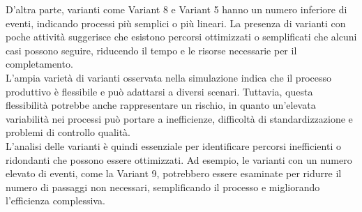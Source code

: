 \documentclass{article}
\begin{document}
D'altra parte, varianti come Variant 8 e Variant 5 hanno un numero inferiore di eventi, indicando processi più semplici o più lineari. La presenza di varianti con poche attività suggerisce che esistono percorsi ottimizzati o semplificati che alcuni casi possono seguire, riducendo il tempo e le risorse necessarie per il completamento.\\
L'ampia varietà di varianti osservata nella simulazione indica che il processo produttivo è flessibile e può adattarsi a diversi scenari. Tuttavia, questa flessibilità potrebbe anche rappresentare un rischio, in quanto un'elevata variabilità nei processi può portare a inefficienze, difficoltà di standardizzazione e problemi di controllo qualità.\\
L'analisi delle varianti è quindi essenziale per identificare percorsi inefficienti o ridondanti che possono essere ottimizzati. Ad esempio, le varianti con un numero elevato di eventi, come la Variant 9, potrebbero essere esaminate per ridurre il numero di passaggi non necessari, semplificando il processo e migliorando l'efficienza complessiva.
\end{document}
